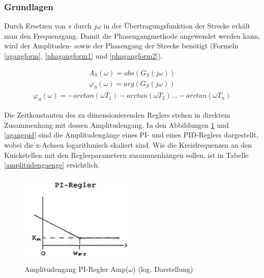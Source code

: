 \subsubsection{Grundlagen}
Durch Ersetzen von $s$ durch $j\omega$ in der Übertragungsfunktion der Strecke erhält man den Frequenzgang. Damit die Phasengangmethode angewendet werden kann, wird der Amplituden- sowie der Phasengang der Strecke benötigt (Formeln \ref{agangform}, \ref{phagangform1} und \ref{phagangform2}).


\begin{align}
A_S(\omega)=abs(G_S(j\omega))
\label{agangform}
\end{align}
\begin{align}
\varphi_S(\omega)=arg(G_S(j\omega))
\label{phagangform1}
\end{align}
\begin{align}
\varphi_S(\omega)=-arctan(\omega T_1)-arctan(\omega T_2)...-arctan(\omega T_n)
\label{phagangform2}
\end{align}\newline

Die Zeitkonstanten des zu dimensionierenden Reglers stehen in direktem Zusammenhang mit dessen Amplitudengang. In den Abbildungen \ref{agangpi} und \ref{agangpid} sind die Amplitudengänge eines PI- und eines PID-Reglers dargestellt, wobei die x-Achsen logarithmisch skaliert sind. Wie die Kreisfrequenzen an den Knickstellen mit den Reglerparametern zusammenhängen sollen, ist in Tabelle \ref{amplitudengaenge} ersichtlich.\newline

\begin{figure}[h]
\centering
\includegraphics[width=0.5\textwidth]{agangpi.png}
\caption{Amplitudengang PI-Regler Amp($\omega$) (log. Darstellung) \cite{zellwegerpha}}
\label{agangpi}
\end{figure}

